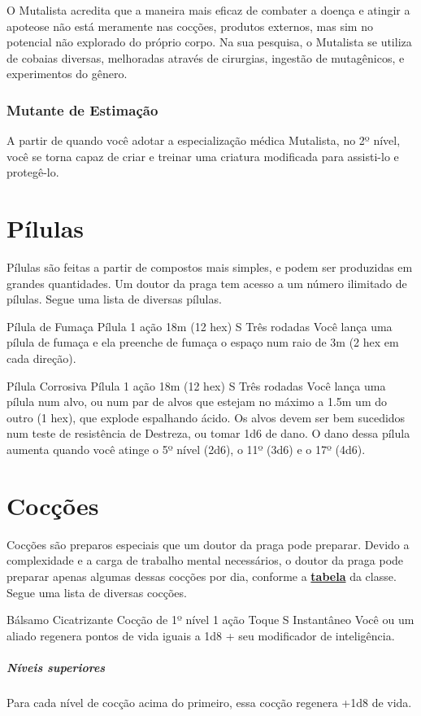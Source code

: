\documentclass[letterpaper,twocolumn,openany]{dndbook}
\begin{document}
	O Mutalista acredita que a maneira mais eficaz de combater a doença e atingir a apoteose não está meramente nas cocções, produtos externos, mas sim no potencial não explorado do próprio corpo. Na sua pesquisa, o Mutalista se utiliza de cobaias diversas, melhoradas através de cirurgias, ingestão de mutagênicos, e experimentos do gênero.
	
	\subsubsection{Mutante de Estimação}
	A partir de quando você adotar a especialização médica Mutalista, no 2º nível, você se torna capaz de criar e treinar uma criatura modificada para assisti-lo e protegê-lo.
		
	\section{Pílulas}
	\label{sec:pilulas}
	Pílulas são feitas a partir de compostos mais simples, e podem ser produzidas em grandes quantidades. Um doutor da praga tem acesso a um número ilimitado de pílulas. Segue uma lista de diversas pílulas.
	
	\spellheader%
	{Pílula de Fumaça}
	{Pílula}
	{1 ação}
	{18m (12 hex)}
	{S}
	{Três rodadas}
	Você lança uma pílula de fumaça e ela preenche de fumaça o espaço num raio de 3m (2 hex em cada direção).
	
	\spellheader%
	{Pílula Corrosiva}
	{Pílula}
	{1 ação}
	{18m (12 hex)}
	{S}
	{Três rodadas}
	Você lança uma pílula num alvo, ou num par de alvos que estejam no máximo a 1.5m um do outro (1 hex), que explode espalhando ácido. Os alvos devem ser bem sucedidos num teste de resistência de Destreza, ou tomar 1d6 de dano. O dano dessa pílula aumenta quando você atinge o 5º nível (2d6), o 11º (3d6) e o 17º (4d6).
	
	\section{Cocções}
	Cocções são preparos especiais que um doutor da praga pode preparar. Devido a complexidade e a carga de trabalho mental necessários, o doutor da praga pode preparar apenas algumas dessas cocções por dia, conforme a \hyperref[tab:doutor_da_praga]{\textbf{tabela}} da classe.
	Segue uma lista de diversas cocções.
	
	\spellheader%
	{Bálsamo Cicatrizante}
	{Cocção de 1º nível}
	{1 ação}
	{Toque}
	{S}
	{Instantâneo}
	Você ou um aliado regenera pontos de vida iguais a 1d8 + seu modificador de inteligência.
	\subparagraph{Níveis superiores} Para cada nível de cocção acima do primeiro, essa cocção regenera +1d8 de vida.
	
\end{document}
